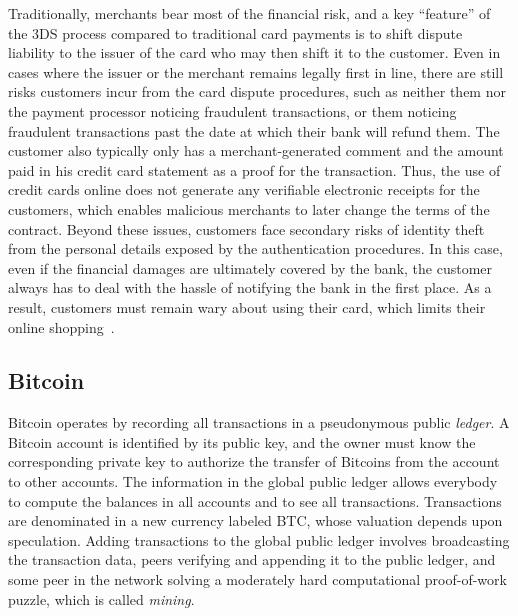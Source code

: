 \documentclass{IEEEtran}
\begin{document}
Traditionally, merchants bear most of the financial risk, and a key
``feature'' of the 3DS process compared to traditional card payments
is to shift dispute liability to the issuer of the card who
may then shift it to the customer.
%
%
Even in cases where the issuer or the merchant remains legally first in
line, there are still risks customers incur from the card dispute
procedures, such as neither them nor the payment processor noticing
fraudulent transactions, or them noticing fraudulent transactions past
the date at which their bank will refund them.  The customer also
typically only has a merchant-generated comment and the amount paid in
his credit card statement as a proof for the transaction.  Thus, the use of
credit cards online does not generate any verifiable electronic
receipts for the customers, which enables malicious merchants to later
change the terms of the contract.  Beyond these issues, customers face
secondary risks of identity theft from the personal details exposed by
the authentication procedures. In this case, even if the financial
damages are ultimately covered by the bank, the customer always has to
deal with the hassle of notifying the bank in the first place.  As a
result, customers must remain wary about using their card, which limits
their online shopping~\cite[p. 50]{ibi2014}.
%



\subsection{Bitcoin}
Bitcoin operates by recording all transactions in a pseu\-do\-ny\-mous
public {\em ledger}.  A Bitcoin account is identified by its public
key, and the owner must know the corresponding private key to authorize
the transfer of Bitcoins from the account to
other accounts.  The information in the global public ledger allows
everybody to compute the balances in all accounts and to see all
transactions.  Transactions are denominated in a new currency labeled
BTC, whose valuation depends upon speculation.  Adding transactions to
the global public ledger involves broadcasting the transaction data,
peers verifying and appending it to the public ledger, and some peer
in the network solving a moderately hard computational proof-of-work
puzzle, which is called {\em mining}.
\end{document}
